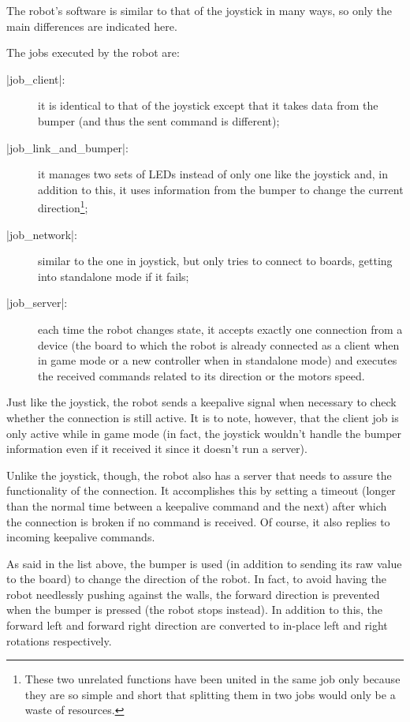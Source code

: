 The robot's software is similar to that of the joystick in many ways, so only
the main differences are indicated here.

\beforelist The jobs executed by the robot are:
\begin{description}
  \item[\Code|job\_client|:] it is identical to that of the joystick except that
    it takes data from the bumper (and thus the sent command is different);
  \item[\Code|job\_link\_and\_bumper|:] it manages two sets of LEDs instead of
    only one like the joystick and, in addition to this, it uses information
    from the bumper to change the current direction\footnote{These two unrelated
    functions have been united in the same job only because they are so simple
    and short that splitting them in two jobs would only be a waste of
    resources.};
  \item[\Code|job\_network|:] similar to the one in joystick, but only tries to
    connect to boards, getting into standalone mode if it fails;
  \item[\Code|job\_server|:] each time the robot changes state, it accepts
    exactly one connection from a device (the board to which the robot is
    already connected as a client when in game mode or a new controller when in
    standalone mode) and executes the received commands related to its direction
    or the motors speed.
\end{description}
\afterlist*
Just like the joystick, the robot sends a keepalive signal when necessary to
check whether the connection is still active.
It is to note, however, that the client job is only active while in game mode
(in fact, the joystick wouldn't handle the bumper information even if it
received it since it doesn't run a server).

Unlike the joystick, though, the robot also has a server that needs to assure
the functionality of the connection.
It accomplishes this by setting a timeout (longer than the normal time between
a keepalive command and the next) after which the connection is broken if no
command is received.
Of course, it also replies to incoming keepalive commands.

As said in the list above, the bumper is used (in addition to sending its raw
value to the board) to change the direction of the robot.
In fact, to avoid having the robot needlessly pushing against the walls, the
forward direction is prevented when the bumper is pressed (the robot stops
instead).
In addition to this, the forward left and forward right direction are converted
to in-place left and right rotations respectively.
